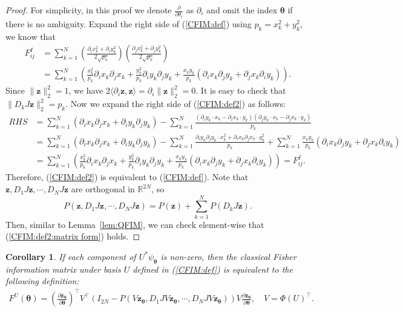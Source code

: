 \documentclass{amsart}
\theoremstyle{plain}
\newtheorem{coro}[theorem]{Corollary}
\theoremstyle{definition}
\theoremstyle{remark}
\newcommand{\RR}{\mathbb{R}}
\begin{document}
\begin{proof}
    For simplicity, in this proof we denote $\frac{\partial}{\partial\theta_i}$ as $\partial_i$ and omit the index $\bm\theta$ if there is no ambiguity. Expand the right side of (\ref{CFIM:def}) using $p_k=x_k^2+y_k^2$, we know that 
    \begin{align*}
        F^I_{ij}&=\sum\limits_{k=1}^{N}\left(\frac{\partial_i x_k^2+\partial_iy_k^2}{2\sqrt{p_k}}\right)\left(\frac{\partial_j x_k^2+\partial_jy_k^2}{2\sqrt{p_k}}\right)\\
        &=\sum\limits_{k=1}^{N}\left(\frac{x_k^2}{p_k}\partial_ix_k\partial_j x_k+\frac{y_k^2}{p_k}\partial_iy_k\partial_j y_k+\frac{x_ky_k}{p_k}(\partial_i x_k\partial_j y_k+\partial_j x_k\partial_i y_k)\right).
    \end{align*}
    Since $\|\bm{z}\|_2^2=1$, we have $2\langle\partial_i\bm{z},\bm{z}\rangle=\partial_i\|\bm{z}\|_2^2=0$. It is easy to check that $\|D_k J\bm{z}\|_2^2=p_k$. Now we expand the right side of (\ref{CFIM:def2}) as follows:
    \begin{align*}
     RHS&=\sum\limits_{k=1}^{N}\left(\partial_i x_k\partial_j x_k+\partial_i y_k\partial_j y_k\right)-\sum\limits_{k=1}^{N}\frac{(\partial_i y_k\cdot x_k-\partial_i x_k\cdot y_k)(\partial_j y_k\cdot x_k-\partial_j x_k\cdot y_k)}{p_k}\\
     &=\sum\limits_{k=1}^{N}\left(\partial_i x_k\partial_j x_k+\partial_i y_k\partial_j y_k\right)-\sum\limits_{k=1}^{N}\frac{\partial_i y_k\partial_j y_k \cdot x_k^2+\partial_i x_k\partial_j x_k\cdot y_k^2}{p_k}+\sum\limits_{k=1}^{N}\frac{x_ky_k}{p_k}(\partial_i x_k\partial_j y_k+\partial_j x_k\partial_i y_k)\\
     &=\sum\limits_{k=1}^{N}\left(\frac{x_k^2}{p_k}\partial_ix_k\partial_j x_k+\frac{y_k^2}{p_k}\partial_iy_k\partial_j y_k+\frac{x_ky_k}{p_k}(\partial_i x_k\partial_j y_k+\partial_j x_k\partial_i y_k)\right)=F^I_{ij}.
    \end{align*}
    Therefore, (\ref{CFIM:def2}) is equivalent to (\ref{CFIM:def}). Note that $\bm{z},D_1J\bm{z},\cdots,D_NJ\bm{z}$ are orthogonal in $\RR^{2N}$, so \[P(\bm{z},D_1J\bm{z},\cdots,D_NJ\bm{z})=P(\bm{z})+\sum\limits_{k=1}^{N}P(D_k J\bm{z}).\] Then, similar to Lemma~\ref{lem:QFIM}, we can check element-wise that (\ref{CFIM:def2:matrix form}) holds.
\end{proof}
\begin{coro}
    If each component of $U^*\psi_{\bm\theta}$ is non-zero, then the classical Fisher information matrix under basis $U$ defined in (\ref{CFIM:def}) is equivalent to the following definition:
    \begin{align}
    \label{CFIM:basis form}
    F^U(\bm\theta)=\left(\frac{\partial \bm{z}_{\bm\theta}}{\partial\bm\theta}\right)^\top V^\top(I_{2N}-P(V\bm{z}_{\bm\theta},D_1JV\bm{z}_{\bm\theta},\cdots,D_NJV\bm{z}_{\bm\theta}))V\frac{\partial \bm{z}_{\bm\theta}}{\partial\bm\theta},\quad V=\Phi(U)^\top.
\end{align}
\end{coro}
\end{document}
